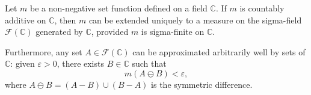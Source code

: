 Let $m$ be a non-negative set function defined on a field $\mathbb{C}$. If $m$ is countably additive on $\mathbb{C}$, then $m$ can be extended uniquely to a measure on the sigma-field $\mathcal{F}(\mathbb{C})$ generated by $\mathbb{C}$, provided $m$ is sigma-finite on $\mathbb{C}$.

Furthermore, any set $A \in \mathcal{F}(\mathbb{C})$ can be approximated arbitrarily well by sets of $\mathbb{C}$: given $\varepsilon > 0$, there exists $B \in \mathbb{C}$ such that
$$m(A \ominus B) < \varepsilon,$$
where $A \ominus B = (A - B) \cup (B - A)$ is the symmetric difference.
